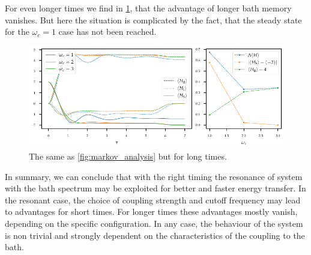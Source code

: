 For even longer times we find in \cref{fig:markov_analysis_steady},
that the advantage of longer bath memory vanishes. But here the
situation is complicated by the fact, that the steady state for the
\(ω_{c}=1\) case has not been reached.
\begin{figure}[h]
  \centering
  \includegraphics{figs/one_bath_syst/markov_analysis_steady}
  \caption{\label{fig:markov_analysis_steady} The same as
    \cref{fig:markov_analysis} but for long times.}
\end{figure}

In summary, we can conclude that with the right timing the resonance
of system with the bath spectrum may be exploited for better and
faster energy transfer. In the resonant case, the choice of coupling
strength and cutoff frequency may lead to advantages for short times.
For longer times these advantages mostly vanish, depending on the
specific configuration. In any case, the behaviour of
the system is non trivial and strongly dependent on the
characteristics of the coupling to the bath.

